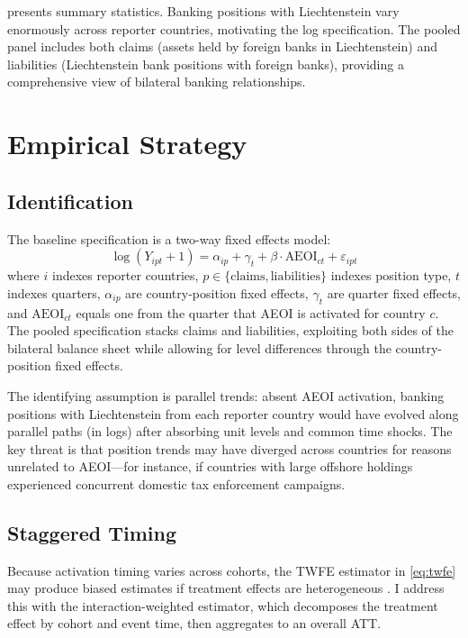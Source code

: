 \documentclass[12pt]{article}
\begin{document}
 presents summary statistics. Banking positions with Liechtenstein vary enormously across reporter countries, motivating the log specification. The pooled panel includes both claims (assets held by foreign banks in Liechtenstein) and liabilities (Liechtenstein bank positions with foreign banks), providing a comprehensive view of bilateral banking relationships.


\section{Empirical Strategy}

\subsection{Identification}

The baseline specification is a two-way fixed effects model:
\begin{equation}
\log(Y_{ipt} + 1) = \alpha_{ip} + \gamma_t + \beta \cdot \text{AEOI}_{ct} + \varepsilon_{ipt}
\label{eq:twfe}
\end{equation}
where $i$ indexes reporter countries, $p \in \{\text{claims}, \text{liabilities}\}$ indexes position type, $t$ indexes quarters, $\alpha_{ip}$ are country-position fixed effects, $\gamma_t$ are quarter fixed effects, and $\text{AEOI}_{ct}$ equals one from the quarter that AEOI is activated for country $c$. The pooled specification stacks claims and liabilities, exploiting both sides of the bilateral balance sheet while allowing for level differences through the country-position fixed effects.

The identifying assumption is parallel trends: absent AEOI activation, banking positions with Liechtenstein from each reporter country would have evolved along parallel paths (in logs) after absorbing unit levels and common time shocks. The key threat is that position trends may have diverged across countries for reasons unrelated to AEOI---for instance, if countries with large offshore holdings experienced concurrent domestic tax enforcement campaigns.

\subsection{Staggered Timing}

Because activation timing varies across cohorts, the TWFE estimator in \cref{eq:twfe} may produce biased estimates if treatment effects are heterogeneous \citep{goodman2021difference, dechaisemartin2020two}. I address this with the \citet{sun2021estimating} interaction-weighted estimator, which decomposes the treatment effect by cohort and event time, then aggregates to an overall ATT.
\end{document}
